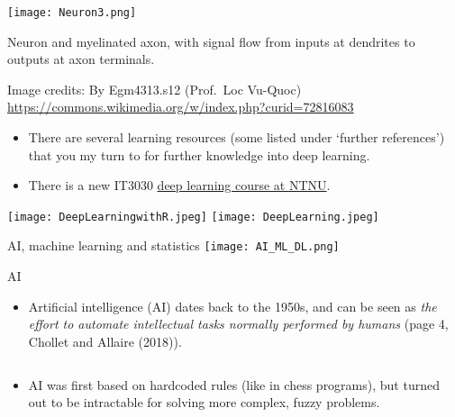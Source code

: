 \documentclass[
  10pt,
  ignorenonframetext,
]{beamer}
\providecommand{\tightlist}{%
  \setlength{\itemsep}{0pt}\setlength{\parskip}{0pt}}
\begin{document}
\begin{frame}
\centering

\texttt{[image: Neuron3.png]}

\flushleft

Neuron and myelinated axon, with signal flow from inputs at dendrites to
outputs at axon terminals.

\scriptsize

Image credits: By Egm4313.s12 (Prof.~Loc Vu-Quoc)
\url{https://commons.wikimedia.org/w/index.php?curid=72816083}
\end{frame}

\begin{frame}
\begin{itemize}
\tightlist
\item
  There are several learning resources (some listed under `further
  references') that you my turn to for further knowledge into deep
  learning.
\item
  There is a new IT3030
  \href{https://www.ntnu.no/studier/emner/IT3030\#tab=omEmnet}{deep
  learning course at NTNU}.
\end{itemize}

\centering

\texttt{[image: DeepLearningwithR.jpeg]}
\texttt{[image: DeepLearning.jpeg]}
\end{frame}

\begin{frame}
\begin{block}{AI, machine learning and statistics}
\protect\hypertarget{ai-machine-learning-and-statistics}{}
\texttt{[image: AI\_ML\_DL.png]}
\end{block}
\end{frame}

\begin{frame}
\begin{block}{AI}
\protect\hypertarget{ai}{}
\(~\)

\begin{itemize}
\tightlist
\item
  Artificial intelligence (AI) dates back to the 1950s, and can be seen
  as \emph{the effort to automate intellectual tasks normally performed
  by humans} (page 4, Chollet and Allaire (2018)).
\end{itemize}

\(~\)

\begin{itemize}
\tightlist
\item
  AI was first based on hardcoded rules (like in chess programs), but
  turned out to be intractable for solving more complex, fuzzy problems.
\end{itemize}

\(~\)
\end{block}
\end{frame}
\end{document}
